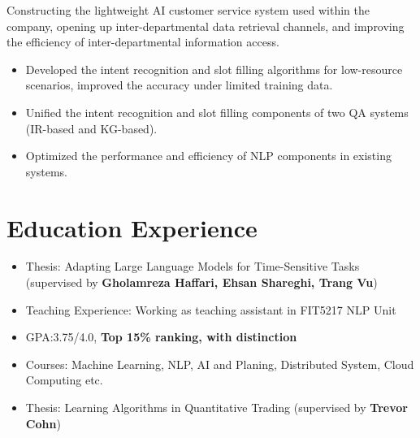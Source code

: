 \documentclass{resume_en}
\begin{document}
Constructing the lightweight AI customer service system used within the company, opening up inter-departmental data retrieval channels, and improving the efficiency of inter-departmental information access.
\begin{itemize}
  \item Developed the intent recognition and slot filling algorithms for low-resource scenarios, improved the accuracy under limited training data.
  \item Unified the intent recognition and slot filling components of two QA systems (IR-based and KG-based).
  \item Optimized the performance and efficiency of NLP components in existing systems.
\end{itemize}


\section{Education Experience}
\begin{itemize}
    \item Thesis: Adapting Large Language Models for Time-Sensitive Tasks \\(supervised by \textbf{Gholamreza Haffari, Ehsan Shareghi, Trang Vu})
    \item Teaching Experience: Working as teaching assistant in FIT5217 NLP Unit
\end{itemize}

\begin{itemize}
    \item GPA:3.75/4.0, \textbf{Top 15\% ranking, with distinction}
    \item Courses: Machine Learning, NLP, AI and Planing, Distributed System, Cloud Computing etc.
    \item Thesis: Learning Algorithms in Quantitative Trading (supervised by \textbf{Trevor Cohn})
\end{itemize}
\end{document}
